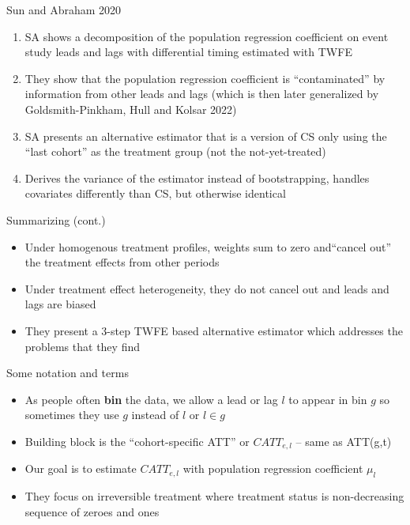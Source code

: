 \documentclass{beamer}
\begin{document}
\begin{frame}{Sun and Abraham 2020}

	\begin{enumerate}
	\item SA shows a decomposition of the population regression coefficient on event study leads and lags with differential timing estimated with TWFE
	\item They show that the population regression coefficient is ``contaminated'' by information from other leads and lags (which is then later generalized by Goldsmith-Pinkham, Hull and Kolsar 2022)
	\item SA presents an alternative estimator that is a version of CS only using the ``last cohort'' as the treatment group (not the not-yet-treated)
	\item Derives the variance of the estimator instead of bootstrapping, handles covariates differently than CS, but otherwise identical
	\end{enumerate}

\end{frame}

\begin{frame}{Summarizing (cont.)}

\begin{itemize}
\item Under homogenous treatment profiles, weights sum to zero and``cancel out'' the treatment effects from other periods 
\item Under treatment effect heterogeneity, they do not cancel out and leads and lags are biased
\item They present a 3-step TWFE based alternative estimator which addresses the problems that they find
\end{itemize}

\end{frame}


\begin{frame}{Some notation and terms}

\begin{itemize}
\item As people often \textbf{bin} the data, we allow a lead or lag $l$ to appear in bin $g$ so sometimes they use $g$ instead of $l$ or $l \in g$
\item Building block is the ``cohort-specific ATT'' or $CATT_{e,l}$ -- same as ATT(g,t)
\item Our goal is to estimate $CATT_{e,l}$ with population regression coefficient $\mu_l$
\item They focus on irreversible treatment where treatment status is non-decreasing sequence of zeroes and ones
\end{itemize}

\end{frame}
\end{document}

